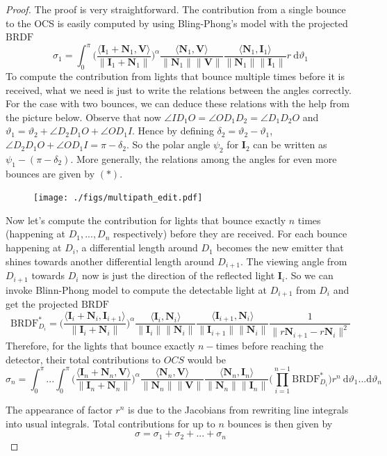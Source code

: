 \documentclass[11pt]{amsart}
\newcommand{\BRDF}{\mathrm{BRDF}}
\newcommand{\ip}[2]{\langle {#1}, {#2} \rangle}
\theoremstyle{definition}
\begin{document}
\begin{proof}
The proof is very straightforward. The contribution from a single bounce to the OCS is easily computed by using Bling-Phong's model with the projected $\BRDF$
$$\sigma_1 =\int_{0}^{\pi}\Bigg(\frac{\ip{\mathbf{I}_1+\mathbf{N}_1}{\mathbf{V}}}{\|\mathbf{I}_1+\mathbf{N}_1\|}\Bigg)^\alpha\frac{\ip{\mathbf{N}_1}{\mathbf{V}}}{\|\mathbf{N}_1\| \|\mathbf{V}\|}\frac{\ip{\mathbf{N}_1}{\mathbf{I}_1}}{\|\mathbf{N}_1\| \|\mathbf{I}_1\|} r\:\mathrm{d}\vartheta_1$$
To compute the contribution from lights that bounce multiple times before it is received, what we need is just to write the relations between the angles correctly. For the case with two bounces, we can deduce these relations with the help from the picture below. Observe that now
$\angle{ID_1O}=\angle{OD_1D_2}=\angle{D_1D_2O}$ and $\vartheta_1=\vartheta_2+\angle{D_2D_1O}+\angle{OD_1I}$. Hence by defining $\delta_2=\vartheta_2-\vartheta_1$, $\angle{D_2D_1O}+\angle{OD_1I}=\pi-\delta_2$. So the polar angle $\psi_2$ for $\mathbf{I}_2$ can be written as $\psi_1-(\pi-\delta_2)$.  More generally,  the relations among the angles for even more bounces are given by  $(*)$.
\begin{figure}[H]
  \texttt{[image: ./figs/multipath\_edit.pdf]}
  \label{fig:reflection}
\end{figure}

Now let's compute the contribution for lights that bounce exactly $n$ times (happening at $D_1,...,D_n$ respectively) before they are received. For each bounce happening at $D_i$, a differential length around $D_1$ becomes the new emitter that shines towards another differential length around $D_{i+1}$. The viewing angle from $D_{i+1}$ towards $D_i$ now is just the direction of the reflected light $\mathbf{I}_{i}$. So we can invoke Blinn-Phong model to compute the detectable light at $D_{i+1}$ from $D_i$ and get the projected $\BRDF$
$$\BRDF^*_{D_i}=\Bigg(\frac{\ip{\mathbf{I}_i+\mathbf{N}_i}{\mathbf{I}_{i+1}}}{\|\mathbf{I}_i+\mathbf{N}_i\|}\Bigg)^\alpha\frac{\ip{\mathbf{I}_i}{\mathbf{N}_i}}{\|\mathbf{I}_i\|\|\mathbf{N}_i\|}\frac{\ip{\mathbf{I}_{i+1}}{\mathbf{N}_i}}{\|\mathbf{I}_{i+1}\|\|\mathbf{N}_i\|} \frac{1}{\|r\mathbf{N}_{i+1}-r\mathbf{N}_i\|^2}$$
Therefore, for the lights that bounce exactly $n-$times before reaching the detector, their total contributions to $OCS$ would be 
\begin{equation*}
\sigma_n =\int_{0}^{\pi}...\int_{0}^{\pi}\Bigg(\frac{\ip{\mathbf{I}_n+\mathbf{N}_n}{\mathbf{V}}}{\|\mathbf{I}_n+\mathbf{N}_n\|}\Bigg)^\alpha\frac{\ip{\mathbf{N}_n}{\mathbf{V}}}{\|\mathbf{N}_n\| \|\mathbf{V}\|}\frac{\ip{\mathbf{N}_n}{\mathbf{I}_n}}{\|\mathbf{N}_n\| \|\mathbf{I}_n\|} \bigg(\prod_{i=1}^{n-1}\BRDF^*_{D_i}\bigg) r^n\: \mathrm{d}\vartheta_1...\mathrm{d}\vartheta_n
\end{equation*}

The appearance of factor $r^n$ is due to the Jacobians from rewriting line integrals into usual integrals. Total contributions for up to $n$ bounces is then given by
 $$ \sigma= \sigma_1+\sigma_2+...+\sigma_n$$
 \end{proof}
 
\end{document}
